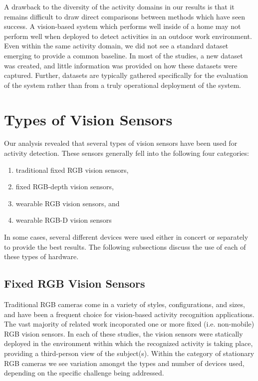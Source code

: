 \documentclass[12pt]{report}
\begin{document}
A drawback to the diversity of the activity domains in our results is that it remains difficult to draw direct comparisons between methods which have seen success. A vision-based system which performs well inside of a home may not perform well when deployed to detect activities in an outdoor work environment. Even within the same activity domain, we did not see a standard dataset emerging to provide a common baseline. In most of the studies, a new dataset was created, and little information was provided on how these datasets were captured. Further, datasets are typically gathered specifically for the evaluation of the system rather than from a truly operational deployment of the system.


\section{Types of Vision Sensors}
Our analysis revealed that several types of vision sensors have been used for activity detection. These sensors generally fell into the following four categories: 
\begin{enumerate}
    \item traditional fixed RGB vision sensors,
    \item fixed RGB-depth vision sensors,
    \item wearable RGB vision sensors, and
    \item wearable RGB-D vision sensors
\end{enumerate}
    
In some cases, several different devices were used either in concert or separately to provide the best results. The following subsections discuss the use of each of these types of hardware.

\subsection{Fixed RGB Vision Sensors}

Traditional RGB cameras come in a variety of styles, configurations, and sizes, and have been a frequent choice for vision-based activity recognition applications. The vast majority of related work incoporated one \cite{Yoshida2010, Savran2018, Beleznai2012, Wu2007, Seki2009, Yiping2006, McIlwraith2008, ElHelw2009, Rowe2007, Lim2009, Chakraborty2013, Zhao2012} or more \cite{McIlwraith2009, Bloisi2009, Martin2017, Hamid2005} fixed (i.e. non-mobile) RGB vision sensors. In each of these studies, the vision sensors were statically deployed in the environment within which the recognized activity is taking place, providing a third-person view of the subject(s). Within the category of stationary RGB cameras we see variation amongst the types and number of devices used, depending on the specific challenge being addressed.
\end{document}

